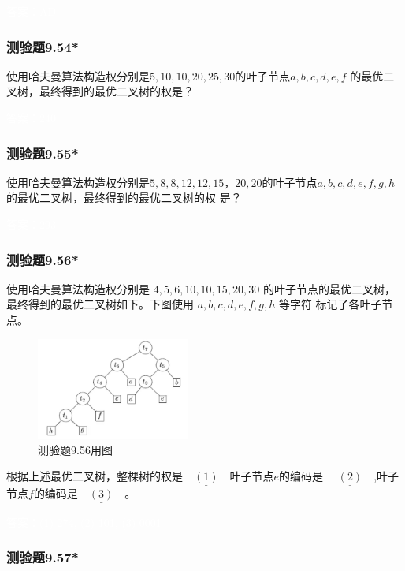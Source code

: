 \documentclass[UTF8, heading=true]{ctexart}
\begin{document}
\textcolor{white}{答案：AD}

\subsubsection{测验题9.54*}

使用哈夫曼算法构造权分别是$5,10, 10,20,25,30$的叶子节点$a, b, c, d, e, f$
的最优二叉树，最终得到的最优二叉树的权是？

\textcolor{white}{答案：240}

\subsubsection{测验题9.55*}

使用哈夫曼算法构造权分别是$5, 8, 8, 12, 12, 15，20,20$的叶子节点$a,b,c,d,e,f,g,h$的最优二叉树，最终得到的最优二叉树的权
是？

\textcolor{white}{答案：293}

\subsubsection{测验题9.56*}

使用哈夫曼算法构造权分别是 $4,5,6,10,10,15,20,30$ 的叶子节点的最优二叉树，
最终得到的最优二叉树如下。下图使用 $a, b, c, d, e, f, g, h$ 等字符
标记了各叶子节点。

\begin{figure}[H]
  \centering
  \includegraphics[width=0.45\textwidth]{9.56.jpg} %
  \caption{测验题9.56用图}
\end{figure}

根据上述最优二叉树，整棵树的权是$\underline{\quad (1) \quad}$叶子节点$e$的编码是
$\underline{\quad (2)\quad}$,叶子节点$f$的编码是$\underline{\quad (3)\quad}$。

\textcolor{white}{答案：(1) 274, (2) 101, (3) 0001}

\subsubsection{测验题9.57*}
\end{document}
